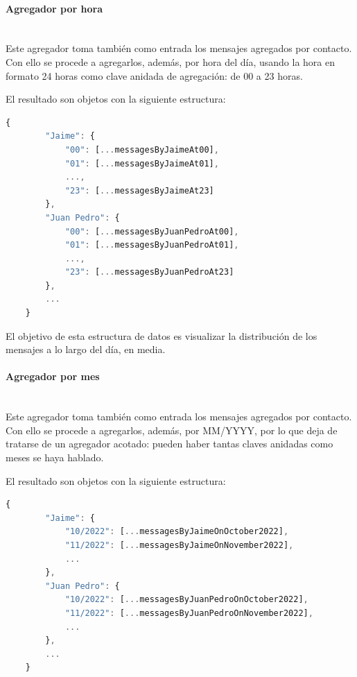 \paragraph{Agregador por hora}\mbox{}\\

Este agregador toma también como entrada los mensajes agregados por contacto. Con ello se procede a agregarlos, además, por hora del día, usando la hora en formato 24 horas como clave anidada de agregación: de 00 a 23 horas.

El resultado son objetos con la siguiente estructura:

\begin{lstlisting}[language=JavaScript]
	{
		"Jaime": {
			"00": [...messagesByJaimeAt00],
			"01": [...messagesByJaimeAt01],
			...,
			"23": [...messagesByJaimeAt23]
		},
		"Juan Pedro": {
			"00": [...messagesByJuanPedroAt00],
			"01": [...messagesByJuanPedroAt01],
			...,
			"23": [...messagesByJuanPedroAt23]
		},
		...
	}
\end{lstlisting}

El objetivo de esta estructura de datos es visualizar la distribución de los mensajes a lo largo del día, en media.

\paragraph{Agregador por mes}\mbox{}\\

Este agregador toma también como entrada los mensajes agregados por contacto. Con ello se procede a agregarlos, además, por MM/YYYY, por lo que deja de tratarse de un agregador acotado: pueden haber tantas claves anidadas como meses se haya hablado.

El resultado son objetos con la siguiente estructura:

\begin{lstlisting}[language=JavaScript]
	{
		"Jaime": {
			"10/2022": [...messagesByJaimeOnOctober2022],
			"11/2022": [...messagesByJaimeOnNovember2022],
			...
		},
		"Juan Pedro": {
			"10/2022": [...messagesByJuanPedroOnOctober2022],
			"11/2022": [...messagesByJuanPedroOnNovember2022],
			...
		},
		...
	}
\end{lstlisting}

